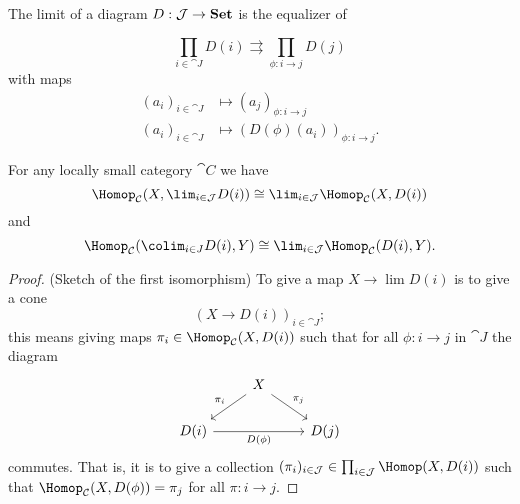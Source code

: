 \documentclass[../main.tex]{subfiles}
\begin{document}
\begin{rmk}\label{rmk:limits-are-products-and-equalisers-in-set}
	The limit of a diagram $D: \mathcal{J} \to \mathbf{Set}$ is the equalizer of 

	\[
		\prod_{i \in \cat J} D(i) \rightrightarrows \prod_{\phi: i \to j} D(j)
	\]
	with maps 
	\begin{align*}
		(a_i)_{i \in \cat J} & \mapsto (a_j)_{\phi: i \to j} \\
		(a_i)_{i \in \cat J} & \mapsto (D(\phi)(a_i))_{\phi: i \to j}.
	\end{align*} 
\end{rmk}


\begin{cor}\label{cor:hom-limits-pass-to-set}
	For any locally small category $\cat C$ we have 
    \[
        \Hom_{\cat C}(X, \lim_{i \in \cat J}D(i)) \cong \lim_{i \in \cat J} \Hom_{\cat C}(X, D(i))
    \] and 
    \[
         \Hom_{\cat C}(\colim_{i \in J} D(i), Y) \cong \lim_{i \in \cat J} \Hom_{\cat C}(D(i), Y).   
    \]
\end{cor}
\begin{proof}(Sketch of the first isomorphism)
To give a map $X \to \lim D(i)$ is to give a cone $$(X \to D(i))_{i \in \cat J};$$ this means giving maps $\pi_i \in \Hom_{\cat C}(X, D(i))$ such that for all $\phi: i \to j$ in $\cat J$ the diagram 
\[\begin{tikzcd}
                            & X \arrow[ld, "\pi_i"'] \arrow[rd, "\pi_j"] &      \\
D(i) \arrow[rr, "D(\phi)"'] &                                            & D(j)
\end{tikzcd}\] commutes. That is, it is to give a collection $(\pi_i)_{i \in \cat J} \in \prod_{i \in \cat J} \Hom(X, D(i))$ such that $\Hom_{\cat C}(X, D(\phi)) = \pi_j$ for all $\pi: i \to j$. 
	
\end{proof}
\end{document}
